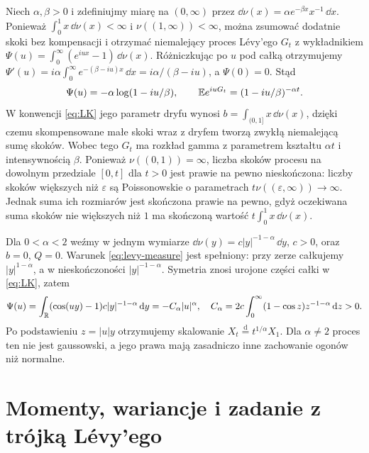 \begin{przyklad}
Niech $\alpha,\beta>0$ i zdefiniujmy miarę na
$(0,\infty)$ przez
$\dd\nu(x)=\alpha e^{-\beta x}x^{-1}\,\dd x$.
Ponieważ $\int_0^1x\,\dd\nu(x)<\infty$ i
$\nu((1,\infty))<\infty$, można zsumować dodatnie
skoki bez kompensacji i otrzymać niemalejący proces Lévy'ego
$G_t$ z wykładnikiem
$\Psi(u)=\int_0^\infty(e^{iux}-1)\,\dd\nu(x)$.
Różniczkując po $u$ pod całką otrzymujemy
$\Psi'(u)=i\alpha\int_0^\infty e^{-(\beta-iu)x}\,\dd x
=i\alpha/(\beta-iu)$, a $\Psi(0)=0$. Stąd
\[
\Psi(u)=-\alpha\log(1-iu/\beta),\qquad
\mathbb{E} e^{iuG_t}=(1-iu/\beta)^{-\alpha t}.
\]
W konwencji \eqref{eq:LK} jego parametr dryfu wynosi
$b=\int_{(0,1]}x\,\dd\nu(x)$, dzięki czemu
skompensowane małe skoki wraz z dryfem tworzą zwykłą
niemalejącą sumę skoków. Wobec tego $G_t$ ma rozkład gamma z parametrem kształtu
$\alpha t$ i intensywnością $\beta$.
Ponieważ $\nu((0,1))=\infty$, liczba skoków procesu
na dowolnym przedziale $[0,t]$ dla $t>0$ jest prawie
na pewno nieskończona: liczby skoków większych niż
$\varepsilon$ są Poissonowskie o parametrach
$t\nu((\varepsilon,\infty))\to\infty$.
Jednak suma ich rozmiarów jest skończona prawie na pewno,
gdyż oczekiwana suma skoków nie większych niż $1$
ma skończoną wartość $t\int_0^1x\,\dd\nu(x)$.
\end{przyklad}

\begin{przyklad}
Dla $0<\alpha<2$ weźmy w jednym wymiarze
$\dd\nu(y)=c|y|^{-1-\alpha}\,\dd y$, $c>0$,
oraz $b=0$, $Q=0$. Warunek \eqref{eq:levy-measure}
jest spełniony: przy zerze całkujemy $|y|^{1-\alpha}$,
a w nieskończoności $|y|^{-1-\alpha}$.
Symetria znosi urojone części całki w \eqref{eq:LK}, zatem
\[
\Psi(u)=\int_{\mathbb{R}}(\cos(uy)-1)c|y|^{-1-\alpha}\,\mathrm{d} y
=-C_\alpha |u|^\alpha,
\quad
C_\alpha=2c\int_0^\infty(1-\cos z)z^{-1-\alpha}\,\mathrm{d} z>0.
\]
Po podstawieniu $z=|u|y$ otrzymujemy skalowanie
$X_t\overset{\mathrm d}=t^{1/\alpha}X_1$.
Dla $\alpha\ne2$ proces ten nie jest gaussowski, a jego
prawa mają zasadniczo inne zachowanie ogonów niż normalne.
\end{przyklad}

\section{Momenty, wariancje i zadanie z trójką Lévy'ego}

